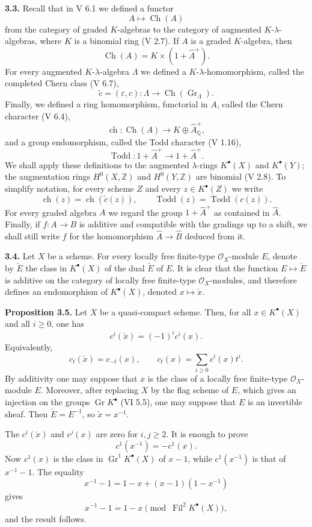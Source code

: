 \documentclass[11pt]{article}
\newcommand{\Gr}{\operatorname{Gr}}
\newcommand{\Fil}{\operatorname{Fil}}
\newcommand{\ch}{\operatorname{ch}}
\newcommand{\Todd}{\operatorname{Todd}}
\providecommand{\ch}{\operatorname{ch}}
\providecommand{\Todd}{\operatorname{Todd}}
\providecommand{\Gr}{\operatorname{Gr}}
\providecommand{\Gr}{\operatorname{G}}
\begin{document}
\textbf{3.3.} Recall that in V 6.1 we defined a functor
\[
A\longmapsto \operatorname{Ch}(A)
\]
from the category of graded $K$-algebras to the category of augmented $K$-$\lambda$-algebras, where $K$ is a binomial ring (V 2.7). If $A$ is a graded $K$-algebra, then
\[
\operatorname{Ch}(A)=K\times(1+\widehat A^+).
\]
For every augmented $K$-$\lambda$-algebra $\Lambda$ we defined a $K$-$\lambda$-homomorphism, called the completed Chern class (V 6.7),
\[
\widetilde c=(\varepsilon,c):\Lambda\longrightarrow\operatorname{Ch}(\Gr_{\Lambda}).
\]
Finally, we defined a ring homomorphism, functorial in $A$, called the Chern character (V 6.4),
\[
\ch:\operatorname{Ch}(A)\longrightarrow K\oplus\widehat A^+_{\mathbb Q},
\]
and a group endomorphism, called the Todd character (V 1.16),
\[
\Todd:1+\widehat A^+\longrightarrow 1+\widehat A^+.
\]
We shall apply these definitions to the augmented $\lambda$-rings $K^{\bullet}(X)$ and $K^{\bullet}(Y)$; the augmentation rings $H^0(X,\mathbb Z)$ and $H^0(Y,\mathbb Z)$ are binomial (V 2.8). To simplify notation, for every scheme $Z$ and every $z\in K^{\bullet}(Z)$ we write
\[
\ch(z)=\ch(\widetilde c(z)),
\qquad
\Todd(z)=\Todd(c(z)).
\]
For every graded algebra $A$ we regard the group $1+\widehat A^+$ as contained in $\widehat A$. Finally, if $f:A\to B$ is additive and compatible with the gradings up to a shift, we shall still write $f$ for the homomorphism $\widehat A\to\widehat B$ deduced from it.

\textbf{3.4.} Let $X$ be a scheme. For every locally free finite-type $\mathcal O_X$-module $E$, denote by $\check E$ the class in $K^{\bullet}(X)$ of the dual $\check E$ of $E$. It is clear that the function $E\mapsto\check E$ is additive on the category of locally free finite-type $\mathcal O_X$-modules, and therefore defines an endomorphism of $K^{\bullet}(X)$, denoted $x\mapsto\check x$.

\textbf{Proposition 3.5.} Let $X$ be a quasi-compact scheme. Then, for all $x\in K^{\bullet}(X)$ and all $i\geq0$, one has
\[
c^i(\check x)=(-1)^i c^i(x).
\]
Equivalently,
\[
c_t(\check x)=c_{-t}(x),
\qquad
c_t(x)=\sum_{i\geq0}c^i(x)t^i.
\]
By additivity one may suppose that $x$ is the class of a locally free finite-type $\mathcal O_X$-module $E$. Moreover, after replacing $X$ by the flag scheme of $E$, which gives an injection on the groups $\Gr K^{\bullet}$ (VI 5.5), one may suppose that $E$ is an invertible sheaf. Then $\check E=E^{-1}$, so $\check x=x^{-1}$.

The $c^i(\check x)$ and $c^j(x)$ are zero for $i,j\geq2$. It is enough to prove
\[
c^1(x^{-1})=-c^1(x).
\]
Now $c^1(x)$ is the class in $\Gr^1K^{\bullet}(X)$ of $x-1$, while $c^1(x^{-1})$ is that of $x^{-1}-1$. The equality
\[
x^{-1}-1=1-x+(x-1)(1-x^{-1})
\]
gives
\[
x^{-1}-1=1-x\pmod{\Fil^2K^{\bullet}(X)},
\]
and the result follows.
\end{document}
